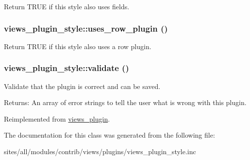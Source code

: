 Return TRUE if this style also uses fields. \hypertarget{classviews__plugin__style_92ca48fa0359e70572f9a226ac54697f}{
\subsubsection[{uses\_\-row\_\-plugin}]{\setlength{\rightskip}{0pt plus 5cm}views\_\-plugin\_\-style::uses\_\-row\_\-plugin ()}}
\label{classviews__plugin__style_92ca48fa0359e70572f9a226ac54697f}


Return TRUE if this style also uses a row plugin. \hypertarget{classviews__plugin__style_41929fec27cb0ae7a801276969a080a1}{
\subsubsection[{validate}]{\setlength{\rightskip}{0pt plus 5cm}views\_\-plugin\_\-style::validate ()}}
\label{classviews__plugin__style_41929fec27cb0ae7a801276969a080a1}


Validate that the plugin is correct and can be saved.

\begin{Desc}
\item[Returns:]An array of error strings to tell the user what is wrong with this plugin. \end{Desc}


Reimplemented from \hyperlink{classviews__plugin_af004b6a719837f08a1ffe4a1cf4d442}{views\_\-plugin}.

The documentation for this class was generated from the following file:\begin{CompactItemize}
\item 
sites/all/modules/contrib/views/plugins/views\_\-plugin\_\-style.inc\end{CompactItemize}
